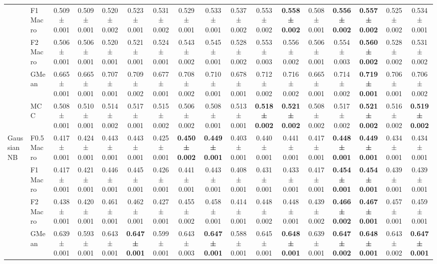 \begin{table}[H]
{\begin{tabular}{llccccccccccccccc}
 & F1 Macro & 0.509 ± 0.001 & 0.509 ± 0.001 & 0.520 ± 0.002 & 0.523 ± 0.001 & 0.531 ± 0.002 & 0.529 ± 0.001 & 0.533 ± 0.001 & 0.537 ± 0.002 & 0.553 ± 0.002 & \textbf{0.558 ± 0.002} & 0.508 ± 0.001 & \textbf{0.556 ± 0.002} & \textbf{0.557 ± 0.002} & 0.525 ± 0.002 & 0.534 ± 0.001 \\
 & F2 Macro & 0.506 ± 0.001 & 0.506 ± 0.001 & 0.520 ± 0.001 & 0.521 ± 0.001 & 0.524 ± 0.001 & 0.543 ± 0.002 & 0.545 ± 0.001 & 0.528 ± 0.002 & 0.553 ± 0.003 & 0.556 ± 0.002 & 0.506 ± 0.001 & 0.554 ± 0.003 & \textbf{0.560 ± 0.002} & 0.528 ± 0.002 & 0.531 ± 0.002 \\
 & GMean & 0.665 ± 0.001 & 0.665 ± 0.001 & 0.707 ± 0.001 & 0.709 ± 0.002 & 0.677 ± 0.001 & 0.708 ± 0.002 & 0.710 ± 0.001 & 0.678 ± 0.001 & 0.712 ± 0.002 & 0.716 ± 0.002 & 0.665 ± 0.001 & 0.714 ± 0.002 & \textbf{0.719 ± 0.001} & 0.706 ± 0.001 & 0.706 ± 0.002 \\
 & MCC & 0.508 ± 0.001 & 0.510 ± 0.001 & 0.514 ± 0.002 & 0.517 ± 0.001 & 0.515 ± 0.002 & 0.506 ± 0.002 & 0.508 ± 0.001 & 0.513 ± 0.001 & \textbf{0.518 ± 0.002} & \textbf{0.521 ± 0.002} & 0.508 ± 0.002 & 0.517 ± 0.002 & \textbf{0.521 ± 0.002} & 0.516 ± 0.002 & \textbf{0.519 ± 0.002} \\
\cline{1-17}
\multirow[t]{5}{*}{GaussianNB} & F0.5 Macro & 0.417 ± 0.001 & 0.424 ± 0.001 & 0.443 ± 0.001 & 0.443 ± 0.001 & 0.425 ± 0.001 & \textbf{0.450 ± 0.002} & \textbf{0.449 ± 0.001} & 0.403 ± 0.001 & 0.440 ± 0.001 & 0.441 ± 0.001 & 0.417 ± 0.001 & \textbf{0.448 ± 0.001} & \textbf{0.449 ± 0.001} & 0.434 ± 0.001 & 0.434 ± 0.001 \\
 & F1 Macro & 0.417 ± 0.001 & 0.421 ± 0.001 & 0.446 ± 0.001 & 0.445 ± 0.001 & 0.426 ± 0.001 & 0.441 ± 0.001 & 0.443 ± 0.001 & 0.408 ± 0.001 & 0.431 ± 0.001 & 0.433 ± 0.001 & 0.417 ± 0.001 & \textbf{0.454 ± 0.001} & \textbf{0.454 ± 0.001} & 0.439 ± 0.001 & 0.439 ± 0.001 \\
 & F2 Macro & 0.438 ± 0.001 & 0.420 ± 0.001 & 0.461 ± 0.001 & 0.462 ± 0.001 & 0.427 ± 0.001 & 0.455 ± 0.002 & 0.458 ± 0.001 & 0.414 ± 0.001 & 0.448 ± 0.002 & 0.448 ± 0.001 & 0.439 ± 0.002 & \textbf{0.466 ± 0.002} & \textbf{0.467 ± 0.001} & 0.457 ± 0.001 & 0.459 ± 0.001 \\
 & GMean & 0.639 ± 0.001 & 0.593 ± 0.001 & 0.643 ± 0.001 & \textbf{0.647 ± 0.001} & 0.599 ± 0.001 & 0.643 ± 0.003 & \textbf{0.647 ± 0.001} & 0.588 ± 0.001 & 0.645 ± 0.001 & \textbf{0.648 ± 0.001} & 0.639 ± 0.001 & \textbf{0.647 ± 0.002} & \textbf{0.648 ± 0.001} & 0.643 ± 0.002 & \textbf{0.647 ± 0.001} \\

\end{tabular}}
\end{table}
